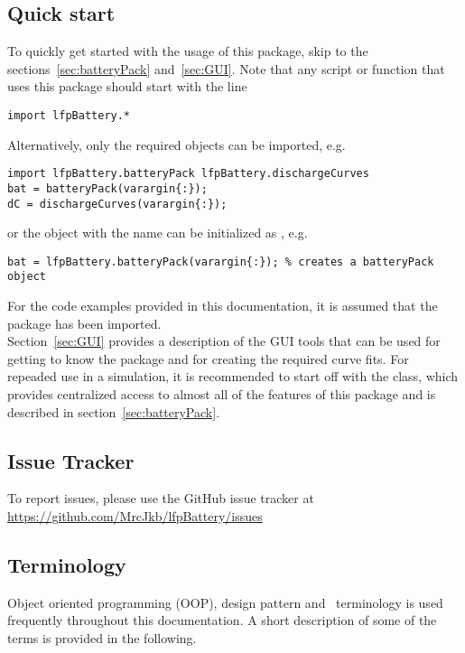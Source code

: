 \subsection*{Quick start}
To quickly get started with the usage of this package, skip to the sections~\ref{sec:batteryPack} and~\ref{sec:GUI}. Note that any script or function that uses this package should start with the line
\begin{lstlisting}
import lfpBattery.*
\end{lstlisting}
Alternatively, only the required objects can be imported, e.g.
\begin{lstlisting}
import lfpBattery.batteryPack lfpBattery.dischargeCurves
bat = batteryPack(varargin{:});
dC = dischargeCurves(varargin{:});
\end{lstlisting}
or the object with the name  can be initialized as , e.g.
\begin{lstlisting}
bat = lfpBattery.batteryPack(varargin{:}); % creates a batteryPack object
\end{lstlisting}
For the code examples provided in this documentation, it is assumed that the  package has been imported. \\
Section~\ref{sec:GUI} provides a description of the GUI tools that can be used for getting to know the package and for creating the required curve fits. For repeaded use in a simulation, it is recommended to start off with the  class, which provides centralized access to almost all of the features of this package and is described in section~\ref{sec:batteryPack}.

\subsection*{Issue Tracker}
To report issues, please use the GitHub issue tracker at \url{https://github.com/MrcJkb/lfpBattery/issues}

\subsection*{Terminology}
Object oriented programming (OOP), design pattern and \matlab\ terminology is used frequently throughout this documentation. A short description of some of the terms is provided in the following.

